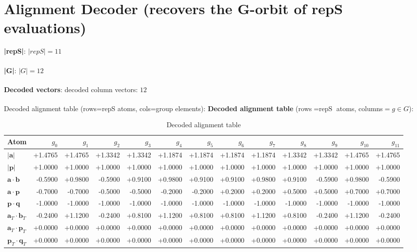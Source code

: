 \documentclass[a4paper,11pt]{article}
\newcommand{\vc}[1]{\ensuremath{\mathbf{#1}}}
\newcommand{\dnfagmiihhiejm}[1]{|\vc{#1}|}
\newcommand{\pdcegfomjfhook}[2]{\mathbf{#1} \cdot \mathbf{#2}}
\newcommand{\fpbeomcfokjooi}[2]{\mathbf{#1}_T \cdot \mathbf{#2}_T}
\begin{document}
\section{Alignment Decoder  (recovers the G-orbit of repS evaluations)}
\textbf{  |repS|}: $|repS| = 11$\\\\
\textbf{  |G|}: $|G| = 12$\\\\
\textbf{  Decoded vectors}: decoded column vectors: $12$\\\\

  Decoded alignment table  (rows=repS atoms, cols=group elements):
\textbf{Decoded alignment table} (rows$=\text{repS}$ atoms, columns$=g\in G$):\\
\begin{table}[h]\centering
\caption{Decoded alignment table}
\begin{tabular}{lrrrrrrrrrrrr}
\toprule
Atom & $g_{0}$ & $g_{1}$ & $g_{2}$ & $g_{3}$ & $g_{4}$ & $g_{5}$ & $g_{6}$ & $g_{7}$ & $g_{8}$ & $g_{9}$ & $g_{10}$ & $g_{11}$ \\
\midrule
$\dnfagmiihhiejm{a}$ & +1.4765 & +1.4765 & +1.3342 & +1.3342 & +1.1874 & +1.1874 & +1.1874 & +1.1874 & +1.3342 & +1.3342 & +1.4765 & +1.4765 \\
$\dnfagmiihhiejm{p}$ & +1.0000 & +1.0000 & +1.0000 & +1.0000 & +1.0000 & +1.0000 & +1.0000 & +1.0000 & +1.0000 & +1.0000 & +1.0000 & +1.0000 \\
$\pdcegfomjfhook{a}{b}$ & -0.5900 & +0.9800 & -0.5900 & +0.9100 & +0.9800 & +0.9100 & +0.9100 & +0.9800 & +0.9100 & -0.5900 & +0.9800 & -0.5900 \\
$\pdcegfomjfhook{a}{p}$ & -0.7000 & -0.7000 & -0.5000 & -0.5000 & -0.2000 & -0.2000 & +0.2000 & +0.2000 & +0.5000 & +0.5000 & +0.7000 & +0.7000 \\
$\pdcegfomjfhook{p}{q}$ & -1.0000 & -1.0000 & -1.0000 & -1.0000 & -1.0000 & -1.0000 & -1.0000 & -1.0000 & -1.0000 & -1.0000 & -1.0000 & -1.0000 \\
$\fpbeomcfokjooi{a}{b}$ & -0.2400 & +1.1200 & -0.2400 & +0.8100 & +1.1200 & +0.8100 & +0.8100 & +1.1200 & +0.8100 & -0.2400 & +1.1200 & -0.2400 \\
$\fpbeomcfokjooi{a}{p}$ & +0.0000 & +0.0000 & +0.0000 & +0.0000 & +0.0000 & +0.0000 & +0.0000 & +0.0000 & +0.0000 & +0.0000 & +0.0000 & +0.0000 \\
$\fpbeomcfokjooi{p}{q}$ & +0.0000 & +0.0000 & +0.0000 & +0.0000 & +0.0000 & +0.0000 & +0.0000 & +0.0000 & +0.0000 & +0.0000 & +0.0000 & +0.0000 \\

\end{tabular}
\end{table}
\end{document}
